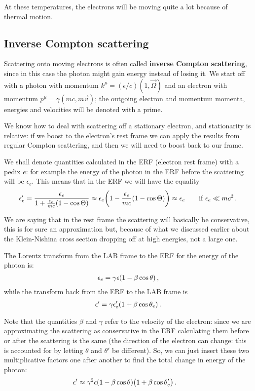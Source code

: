 \documentclass[main.tex]{subfiles}
\begin{document}
At these temperatures, the electrons will be moving quite a lot because of thermal motion. 

\subsection{Inverse Compton scattering}

Scattering onto moving electrons is often called \textbf{inverse Compton scattering}, since in this case the photon might gain energy instead of losing it. 
We start off with a photon with momentum \(k^{\mu } = (\epsilon /c) (1, \vec{\Omega})\) and an electron with momentum \(p^{\mu } = \gamma (mc, m \vec{v})\); the outgoing electron and momentum momenta, energies and velocities will be denoted with a prime. 

We know how to deal with scattering off a stationary electron, and stationarity is relative: if we boost to the electron's rest frame we can apply the results from regular Compton scattering, and then we will need to boost back to our frame. 

We shall denote quantities calculated in the ERF (electron rest frame) with a pedix \(e\): for example the energy of the photon in the ERF before the scattering will be \(\epsilon_e\).
This means that in the ERF we will have the equality 
%
\begin{align}
\epsilon_e' 
= \frac{\epsilon_e}{1 + \frac{\epsilon_e}{mc} (1 - \cos \Theta )} 
\approx \epsilon_e \qty(1 - \frac{\epsilon_e}{mc} (1 - \cos \Theta )) 
\approx \epsilon_e 
\qquad \text{if } \epsilon_e \ll m c^2 
\,.
\end{align}

We are saying that in the rest frame the scattering will basically be conservative, this is for sure an approximation but, because of what we discussed earlier about the Klein-Nishina cross section dropping off at high energies, not a large one. 

The Lorentz transform from the LAB frame to the ERF for the energy of the photon is: 
%
\begin{align}
\epsilon_e = \gamma \epsilon \qty(1 - \beta \cos \theta )
\,,
\end{align}
%
while the transform back from  the ERF to the LAB frame is 
%
\begin{align}
\epsilon' = \gamma \epsilon_e' \qty(1 + \beta \cos \theta _e )
\,.
\end{align}

Note that the quantities \(\beta \) and \(\gamma \) refer to the velocity of the electron: since we are approximating the scattering as conservative in the ERF calculating them before or after the scattering is the same (the direction of the electron can change: this is accounted for by letting \(\theta\) and \(\theta '\) be different). 
So, we can just insert these two multiplicative factors one after another to find the total change in energy of the photon: 
%
\begin{align}
\epsilon ' &\approx \gamma^2 \epsilon \qty(1 - \beta \cos \theta ) \qty(1 + \beta \cos \theta'_e ) 
\,.
\end{align}
\end{document}
